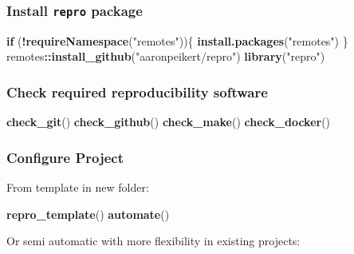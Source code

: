 \documentclass[12pt,a4paper,]{article}
\newenvironment{Shaded}{\begin{snugshade}}{\end{snugshade}}
\newcommand{\ControlFlowTok}[1]{\textcolor[rgb]{0.13,0.29,0.53}{\textbf{#1}}}
\newcommand{\KeywordTok}[1]{\textcolor[rgb]{0.13,0.29,0.53}{\textbf{#1}}}
\newcommand{\NormalTok}[1]{#1}
\newcommand{\OperatorTok}[1]{\textcolor[rgb]{0.81,0.36,0.00}{\textbf{#1}}}
\newcommand{\StringTok}[1]{\textcolor[rgb]{0.31,0.60,0.02}{#1}}
\begin{document}
\hypertarget{install-repro-package}{%
\subsubsection{\texorpdfstring{Install \texttt{repro} package}{Install repro package}}\label{install-repro-package}}

\begin{Shaded}
\begin{Highlighting}[]
\ControlFlowTok{if}\NormalTok{ (}\OperatorTok{!}\KeywordTok{requireNamespace}\NormalTok{(}\StringTok{"remotes"}\NormalTok{))\{}
  \KeywordTok{install.packages}\NormalTok{(}\StringTok{"remotes"}\NormalTok{)}
\NormalTok{\}}
\NormalTok{remotes}\OperatorTok{::}\KeywordTok{install_github}\NormalTok{(}\StringTok{"aaronpeikert/repro"}\NormalTok{)}
\KeywordTok{library}\NormalTok{(}\StringTok{"repro"}\NormalTok{)}
\end{Highlighting}
\end{Shaded}

\hypertarget{check-required-reproducibility-software}{%
\subsubsection{Check required reproducibility software}\label{check-required-reproducibility-software}}

\begin{Shaded}
\begin{Highlighting}[]
\KeywordTok{check_git}\NormalTok{()}
\KeywordTok{check_github}\NormalTok{()}
\KeywordTok{check_make}\NormalTok{()}
\KeywordTok{check_docker}\NormalTok{()}
\end{Highlighting}
\end{Shaded}

\hypertarget{configure-project}{%
\subsubsection{Configure Project}\label{configure-project}}

From template in new folder:

\begin{Shaded}
\begin{Highlighting}[]
\KeywordTok{repro_template}\NormalTok{()}
\KeywordTok{automate}\NormalTok{()}
\end{Highlighting}
\end{Shaded}

Or semi automatic with more flexibility in existing projects:
\end{document}
